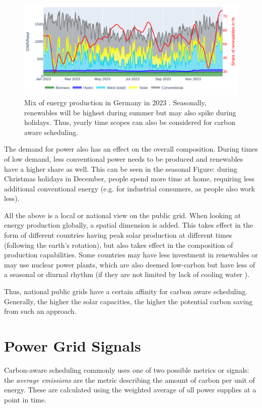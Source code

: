\begin{figure}
    \includegraphics[width=\linewidth]{agorameter/energy_production_year.pdf}
    \caption[short]{Mix of energy production in Germany in 2023 . Seasonally, renewables will be highest during summer but may also spike during holidays. Thus, yearly time scopes can also be considered for carbon aware scheduling.}
    \label{fig:energy_mix_year}
\end{figure}

The demand for power also has an effect on the overall composition. 
During times of low demand, less conventional power needs to be produced and renewables have a higher share as well.
This can be seen in the seasonal Figure: during Christmas holidays in December, people spend more time at home, requiring less additional conventional energy (e.g. for industrial consumers, as people also work less).

All the above is a local or national view on the public grid. 
When looking at energy production globally, a spatial dimension is added. 
This takes effect in the form of different countries having peak solar production at different times (following the earth's rotation), but also takes effect in the composition of production capabilities.
Some countries may have less investment in renewables or may use nuclear power plants, which are also deemed low-carbon but have less of a seasonal or diurnal rhythm (if they are not limited by lack of cooling water ).

Thus, national public grids have a certain affinity for carbon aware scheduling\cite{wiesner_lets_2021}. Generally, the higher the solar capacities, the higher the potential carbon saving from such an approach. 

\section{Power Grid Signals}
Carbon-aware scheduling commonly uses one of two possible metrics or signals: the \emph{average emissions} are the metric describing the amount of carbon per unit of energy. These are calculated using the weighted average of all power supplies at a point in time.

